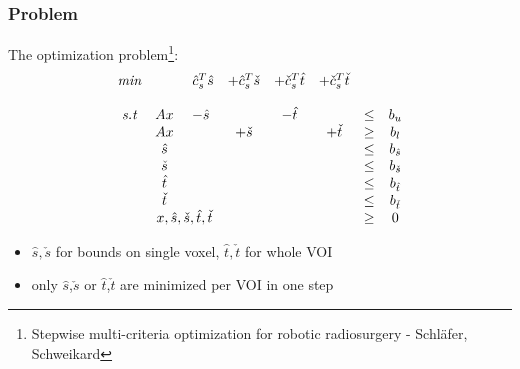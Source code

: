 \documentclass{beamer}
\begin{document}
	\begin{frame}
		\frametitle{Problem}
		The optimization problem\footnote{Stepwise multi-criteria optimization for robotic radiosurgery - Schläfer, Schweikard}:		
		\begin{equation}
			\begin{matrix}
			\textit{min} &            & ~\hat{c}_s^T\hat{s} & +\hat{c}_s^T\check{s}    & +\check{c}_s^T\hat{t} & +\check{c}_s^T\check{t} & & \\\\
			\textit{s.t} & Ax         & -\hat{s}            &            & -\hat{t}  &            & \leq & b_u\\
			 		     & Ax         & 		            & +\check{s} &           & +\check{t} & \geq & b_l\\
					   	 & \hat{s}    & 		            &            &           &            & \leq & b_{\hat{s}}\\
			             & \check{s}  & 	                &            &           &            & \leq & b_{\check{s}}\\
			             & \hat{t}    & 		            &            &           &            & \leq & b_{\hat{t}}\\
			             & \check{t}  & 	                &            &           &            & \leq & b_{\check{t}}\\
						 & \multicolumn{2}{c}{x,\hat{s},\check{s},\hat{t},\check{t}} & & & & \geq & 0
			\end{matrix}		
		\end{equation}
		\begin{itemize}
			\item $\hat{s},\check{s}$ for bounds on single voxel, $\hat{t},\check{t}$ for whole VOI
			\item only $\hat{s}$,$\check{s}$ or $\hat{t}$,$\check{t}$ are minimized per VOI in one step
		\end{itemize}   
	\end{frame}
	
\end{document}
